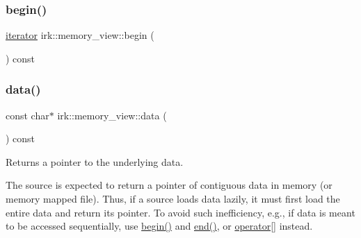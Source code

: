 \mbox{\label{classirk_1_1memory__view_a41d2227984ac0284ec52588a57bd297c}} 
\subsubsection{\texorpdfstring{begin()}{begin()}}
{\footnotesize\ttfamily \mbox{\hyperlink{classirk_1_1memory__view_a425bdc98ffa1c1c6cb018b3b4ad64317}{iterator}} irk\+::memory\+\_\+view\+::begin (\begin{DoxyParamCaption}{ }\end{DoxyParamCaption}) const\hspace{0.3cm}{\ttfamily [inline]}}

\mbox{\label{classirk_1_1memory__view_ab55150c13cf7e380aaaeda8d70d24bed}} 
\subsubsection{\texorpdfstring{data()}{data()}}
{\footnotesize\ttfamily const char$\ast$ irk\+::memory\+\_\+view\+::data (\begin{DoxyParamCaption}{ }\end{DoxyParamCaption}) const\hspace{0.3cm}{\ttfamily [inline]}}



Returns a pointer to the underlying data. 

The source is expected to return a pointer of contiguous data in memory (or memory mapped file). Thus, if a source loads data lazily, it must first load the entire data and return its pointer. To avoid such inefficiency, e.\+g., if data is meant to be accessed sequentially, use \mbox{\hyperlink{classirk_1_1memory__view_a41d2227984ac0284ec52588a57bd297c}{begin()}} and \mbox{\hyperlink{classirk_1_1memory__view_a393e04a837ff706e408fbea11219d7ed}{end()}}, or \mbox{\hyperlink{classirk_1_1memory__view_a21ac618a1eaddf6665148d186f3f67a4}{operator\mbox{[}\mbox{]}}} instead. \mbox{\label{classirk_1_1memory__view_a393e04a837ff706e408fbea11219d7ed}} 
